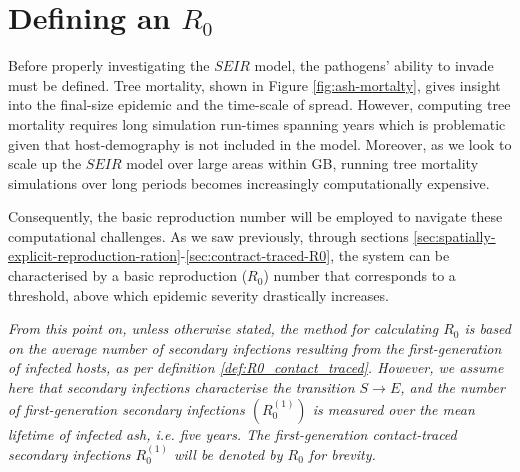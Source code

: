 \section{Defining an $R_0$}
\label{sec:SEIR-R0-definition}

Before properly investigating the $SEIR$ model, the pathogens' ability to invade must be defined. 
Tree mortality, shown in Figure \ref{fig:ash-mortalty}, gives insight into the final-size epidemic and the time-scale of spread.
However, computing tree mortality requires long simulation run-times spanning years which is problematic given that host-demography is not included in the model.
Moreover, as we look to scale up the $SEIR$ model over large areas within GB, running tree mortality simulations over long periods
becomes increasingly computationally expensive. 

Consequently, the basic reproduction number will be employed to navigate these computational challenges. 
As we saw previously, through sections \ref{sec:spatially-explicit-reproduction-ration}-\ref{sec:contract-traced-R0}, 
the system can be characterised by a basic reproduction ($R_0$) number that corresponds to a threshold, above which epidemic severity drastically increases.

\textit{From this point on, unless otherwise stated, the method for calculating $R_0$ is based on the average number of secondary infections
resulting from the first-generation of infected hosts, as per definition \ref{def:R0_contact_traced}. However, we assume here that secondary infections
characterise the transition $S\rightarrow E$, and the number of first-generation secondary infections $(R_0^{(1)})$ is measured over the mean lifetime
of infected ash, i.e. five years. The first-generation contact-traced secondary infections $R_0^{(1)}$ will be denoted by $R_0$ for brevity.}


